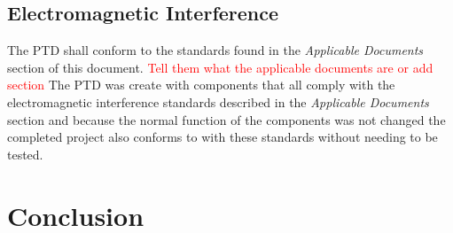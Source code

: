 \documentclass[11pt]{article}
\begin{document}
\subsection{Electromagnetic Interference}
The PTD shall conform to the standards found in the \textit{Applicable Documents} section of this document.
\textcolor{Red}{Tell them what the applicable documents are or add section}
The PTD was create with components that all comply with the electromagnetic interference standards described in the \textit{Applicable Documents} section 
and because the normal function of the components was not changed the completed project also conforms to with these standards without needing to be tested.

\section{Conclusion}
\end{document}
